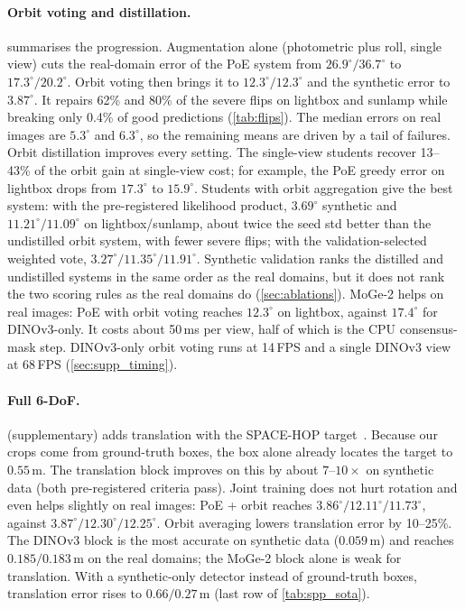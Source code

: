 \paragraph{Orbit voting and distillation.}  summarises the progression. Augmentation alone (photometric plus roll, single view) cuts the real-domain error of the PoE system from $26.9^\circ/36.7^\circ$ to $17.3^\circ/20.2^\circ$. Orbit voting then brings it to $12.3^\circ/12.3^\circ$ and the synthetic error to $3.87^\circ$. It repairs 62\% and 80\% of the severe flips on lightbox and sunlamp while breaking only 0.4\% of good predictions (\cref{tab:flips}). The median errors on real images are $5.3^\circ$ and $6.3^\circ$, so the remaining means are driven by a tail of failures.
Orbit distillation improves every setting. The single-view students recover 13--43\% of the orbit gain at single-view cost; for example, the PoE greedy error on lightbox drops from $17.3^\circ$ to $15.9^\circ$. Students with orbit aggregation give the best system: with the pre-registered likelihood product, $3.69^\circ$ synthetic and $11.21^\circ/11.09^\circ$ on lightbox/sunlamp, about twice the seed std better than the undistilled orbit system, with fewer severe flips; with the validation-selected weighted vote, $3.27^\circ/11.35^\circ/11.91^\circ$. Synthetic validation ranks the distilled and undistilled systems in the same order as the real domains, but it does not rank the two scoring rules as the real domains do (\cref{sec:ablations}).
MoGe-2 helps on real images: PoE with orbit voting reaches $12.3^\circ$ on lightbox, against $17.4^\circ$ for DINOv3-only. It costs about 50\,ms per view, half of which is the CPU consensus-mask step. DINOv3-only orbit voting runs at 14\,FPS and a single DINOv3 view at 68\,FPS (\cref{sec:supp_timing}).

\paragraph{Full 6-DoF.}
\label{sec:sixdof}
 (supplementary) adds translation with the SPACE-HOP target~\cite{dutta2026spacehop}. Because our crops come from ground-truth boxes, the box alone already locates the target to $0.55$\,m. The translation block improves on this by about $7$--$10\times$ on synthetic data (both pre-registered criteria pass). Joint training does not hurt rotation and even helps slightly on real images: PoE + orbit reaches $3.86^\circ/12.11^\circ/11.73^\circ$, against $3.87^\circ/12.30^\circ/12.25^\circ$. Orbit averaging lowers translation error by 10--25\%. The DINOv3 block is the most accurate on synthetic data ($0.059$\,m) and reaches $0.185/0.183$\,m on the real domains; the MoGe-2 block alone is weak for translation. With a synthetic-only detector instead of ground-truth boxes, translation error rises to $0.66/0.27$\,m (last row of \cref{tab:spp_sota}).

